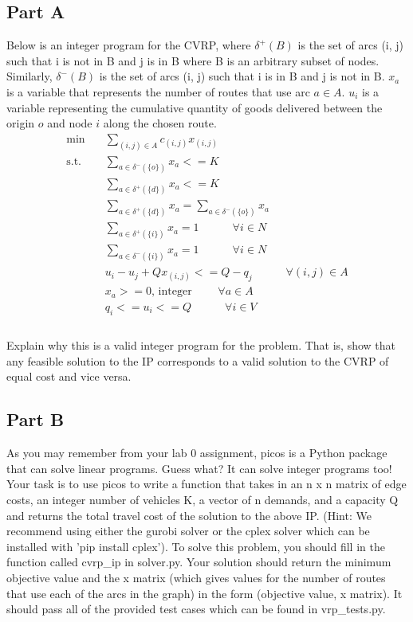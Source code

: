 \documentclass{article}
\begin{document}
\subsection*{Part A}
Below is an integer program for the CVRP, where $\delta^+(B)$ is the set of arcs (i, j) such that i is not in B and j is in B where B is an arbitrary subset of nodes. Similarly, $\delta^-(B)$ is the set of arcs (i, j) such that i is in B and j is not in B. $x_a$ is a variable that represents the number of routes that use arc $a \in A$. $u_i$ is a variable representing the cumulative quantity of goods delivered between the origin $o$ and node $i$ along the chosen route. \\
\[ \begin{aligned}
\min \quad & \sum_{(i,j)\in A}{c_{(i,j)}x_{(i,j)}}\\
\textrm{s.t.} \quad &
  \sum_{a \in \delta^-(\{o\})}{x_a} <= K \\
  \quad & \sum_{a \in \delta^+(\{d\})}{x_a} <= K \\
  \quad & \sum_{a \in \delta^+(\{d\})}{x_a} = \sum_{a \in \delta^-(\{o\})}{x_a} \\
  \quad & \sum_{a \in \delta^+(\{i\})}{x_a} = 1 \quad\quad\quad \forall i \in N \\
  \quad & \sum_{a \in \delta^-(\{i\})}{x_a} = 1 \quad\quad\quad \forall i \in N \\
  \quad & u_i - u_j + Qx_{(i,j)} <= Q - q_j \quad\quad\quad \forall (i,j) \in A \\
  \quad & x_a >=0 \mbox{, integer } \quad\quad \forall a \in A \\
  \quad & q_i <= u_i <= Q \quad\quad\quad \forall i \in V \\
\end{aligned} \]
\\

Explain why this is a valid integer program for the problem. That is, show that any feasible solution to the IP corresponds to a valid solution to the CVRP of equal cost and vice versa.

\subsection*{Part B}
As you may remember from your lab 0 assignment, picos is a Python package that can solve linear programs. Guess what? It can solve integer programs too! Your task is to use picos to write a function that takes in an n x n matrix of edge costs, an integer number of vehicles K, a vector of n demands, and a capacity Q and returns the total travel cost of the solution to the above IP. (Hint: We recommend using either the gurobi solver or the cplex solver which can be installed with 'pip install cplex'). To solve this problem, you should fill in the function called cvrp\_ip in solver.py. Your solution should return the minimum objective value and the x matrix (which gives values for the number of routes that use each of the arcs in the graph) in the form (objective value, x matrix). It should pass all of the provided test cases which can be found in vrp\_tests.py.
\end{document}
